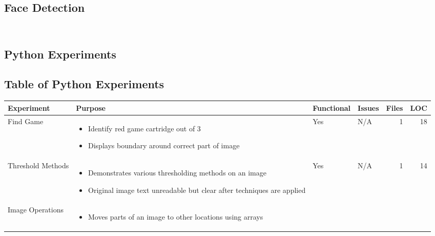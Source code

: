 	\subsection{Face Detection}
	\inputminted[breaklines,
					linenos,
					frame=lines,
					fontsize=\footnotesize]{java}{../code/android/face_recognition/DetectionBasedTracker.java}
	\inputminted[breaklines,
					linenos,
					frame=lines,
					fontsize=\footnotesize]{java}{../code/android/face_recognition/FrActivity.java}
	\clearpage
		\thispagestyle{empty}
		\begin{landscape}
			\section{Python Experiments}\label{app:python_experiments}
			\subsection{Table of Python Experiments}
			\begin{table}[h!]
				\centering
				\label{tab:python_experiments}
				\begin{tabular}{|l|p{0.4\textwidth}|l|p{}|r|r|}
					\hline
					\bfseries Experiment&\bfseries Purpose&\bfseries Functional&\bfseries Issues&\bfseries Files&\bfseries LOC\\
					\hline
					Find Game&
					\begin{itemize}[noitemsep,topsep=0pt,parsep=0pt]
						\item{Identify red game cartridge out of 3}
						\item{Displays boundary around correct part of image}
					\end{itemize}&
					Yes&
					N/A&
					1&
					18\\
					\hline
					Threshold Methods&
					\begin{itemize}[noitemsep,topsep=0pt,parsep=0pt]
						\item{Demonstrates various thresholding methods on an image}
						\item{Original image text unreadable but clear after techniques are applied}
					\end{itemize}&
					Yes&
					N/A&
					1&
					14\\
					\hline
					Image Operations&
					\begin{itemize}[noitemsep,topsep=0pt,parsep=0pt]
						\item{Moves parts of an image to other locations using arrays}

\end{itemize}
\end{tabular}
\end{table}
\end{landscape}
